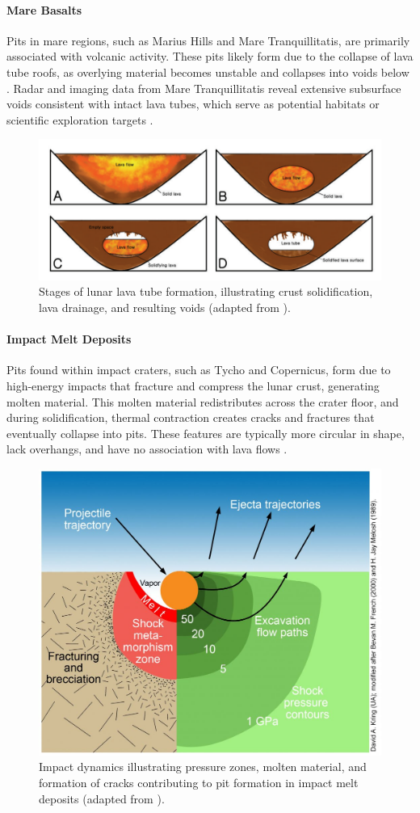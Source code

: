 \paragraph{Mare Basalts} 
Pits in mare regions, such as Marius Hills and Mare Tranquillitatis, are primarily associated with volcanic activity. These pits likely form due to the collapse of lava tube roofs, as overlying material becomes unstable and collapses into voids below \cite{lunar-pits-entrances-to-caves, radar-observations-lava-tubes}. Radar and imaging data from Mare Tranquillitatis reveal extensive subsurface voids consistent with intact lava tubes, which serve as potential habitats or scientific exploration targets \cite{Carrer2024, radar-observations-lava-tubes}.

\begin{figure}[H]
    \centering
    \includegraphics[width=0.7\linewidth]{lava_tube_formation_schema.png}
    \caption{Stages of lunar lava tube formation, illustrating crust solidification, lava drainage, and resulting voids (adapted from \cite{lunar-pits-entrances-to-caves}).}
    \label{fig:lava-tube-formation-schema}
\end{figure}

\paragraph{Impact Melt Deposits} 
Pits found within impact craters, such as Tycho and Copernicus, form due to high-energy impacts that fracture and compress the lunar crust, generating molten material. This molten material redistributes across the crater floor, and during solidification, thermal contraction creates cracks and fractures that eventually collapse into pits. These features are typically more circular in shape, lack overhangs, and have no association with lava flows \cite{clrn-impact-melt, lunar-pits-numerical-modelling}.

\begin{figure}[H]
    \centering
    \includegraphics[width=0.42\linewidth]{Impact-Shock-Pressures-and-Their-Effects-1024x857.jpg}
    \caption{Impact dynamics illustrating pressure zones, molten material, and formation of cracks contributing to pit formation in impact melt deposits (adapted from \cite{clrn-impact-melt}).}
    \label{fig:impact-melt}
\end{figure}

